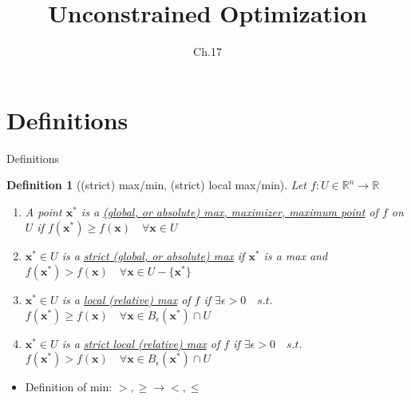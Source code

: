 \documentclass[a4paper,11pt]{article}
\author[조남운]{\mail}
\title{Unconstrained Optimization}
\subtitle{Ch.17}
\newtheorem{defn}{Definition}
\newcommand{\bb}{\mathbb}
\newcommand{\bd}{\mathbf}
\begin{document}
	
\maketitle


\section{Definitions} %
\label{sec:definitions}
\begin{frame}[t]{Definitions}
	\begin{defn}
		[(strict) max/min, (strict) local max/min]
		Let $f:U\in \bb{R}^n\rightarrow \bb{R}$
		\begin{enumerate}
			\item A point $\bd{x}^\ast$ is a \uline{(global, or absolute) max, maximizer, maximum point} of $f$ on $U$ if $f(\bd{x^\ast})\ge f(\bd{x})\quad\forall \bd{x}\in U$
			\item $\bd{x^\ast}\in U$ is a \uline{strict (global, or absolute) max} if $\bd{x^\ast}$ is a max and $f(\bd{x^\ast})>f(\bd{x})\quad\forall \bd{x}\in U-\{\bd{x^\ast}\}$
			\item $\bd{x^\ast}\in U$ is a \uline{local (relative) max} of $f$ if $\exists \epsilon>0 \quad s.t.$ $f(\bd{x^\ast})\ge f(\bd{x})\quad\forall \bd{x}\in B_\epsilon(\bd{x^\ast})\cap U$
			\item $\bd{x^\ast}\in U$ is a \uline{strict local (relative) max} of $f$ if $\exists \epsilon>0 \quad s.t.$ $f(\bd{x^\ast})> f(\bd{x})\quad\forall \bd{x}\in B_\epsilon(\bd{x^\ast})\cap U$
		\end{enumerate}
	\end{defn}
	\begin{itemize}
		\item Definition of min: $>,\ge \rightarrow <, \le$ 
	\end{itemize}
\end{frame}
\end{document}
